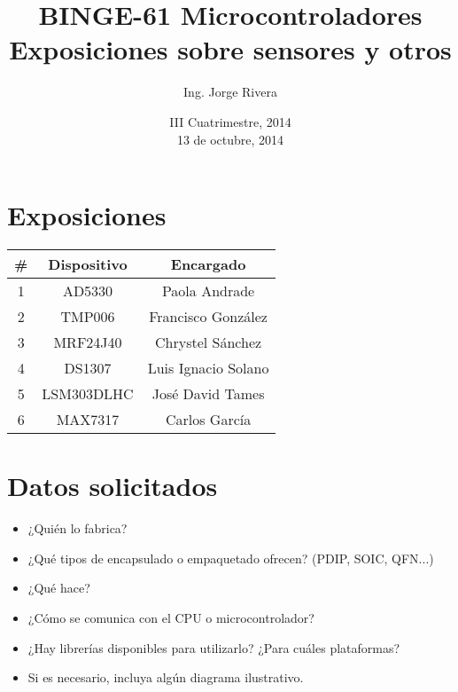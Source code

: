 \documentclass[letterpaper,10pt]{article}
\title{BINGE-61 Microcontroladores\\ Exposiciones sobre sensores y otros}
\author{Ing. Jorge Rivera}
\date{III Cuatrimestre, 2014\\ 13 de octubre, 2014}
\begin{document}
\maketitle

\section{Exposiciones}

\begin{center}
\begin{tabular}{|c|c|c|}\hline


\#  & Dispositivo				& Encargado	\\ \hline\hline
1   & AD5330			 		& Paola Andrade   \\[.2cm]\hline
2   & TMP006					& Francisco González\\[.2cm]\hline
3   & MRF24J40					& Chrystel Sánchez 	\\[.2cm]\hline
4   & DS1307				 	& Luis Ignacio Solano	\\[.2cm]\hline
5   & LSM303DLHC				& José David Tames \\[.2cm]\hline
6	& MAX7317					& Carlos García \\[.2cm]\hline

\end{tabular}
\end{center}

\section{Datos solicitados}
\begin{small}
\begin{itemize}
\item ¿Quién lo fabrica?
\item ¿Qué tipos de encapsulado o empaquetado ofrecen? (PDIP, SOIC, QFN...)
\item ¿Qué hace?
\item ¿Cómo se comunica con el CPU o microcontrolador?
\item ¿Hay librerías disponibles para utilizarlo? ¿Para cuáles plataformas?
\item Si es necesario, incluya algún diagrama ilustrativo.
\end{itemize}
\end{small}
\end{document}
